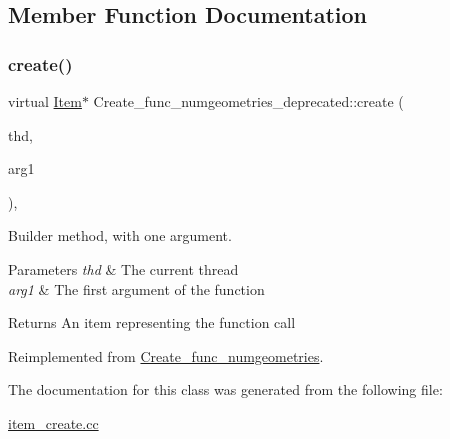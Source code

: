 \subsection{Member Function Documentation}
\mbox{\label{classCreate__func__numgeometries__deprecated_aeb6f235f1d620a8b4188aacfc513c860}} 
\subsubsection{\texorpdfstring{create()}{create()}}
{\footnotesize\ttfamily virtual \mbox{\hyperlink{classItem}{Item}}$\ast$ Create\+\_\+func\+\_\+numgeometries\+\_\+deprecated\+::create (\begin{DoxyParamCaption}\item[{T\+HD $\ast$}]{thd,  }\item[{\mbox{\hyperlink{classItem}{Item}} $\ast$}]{arg1 }\end{DoxyParamCaption})\hspace{0.3cm}{\ttfamily [inline]}, {\ttfamily [virtual]}}

Builder method, with one argument. 
\begin{DoxyParams}{Parameters}
{\em thd} & The current thread \\
\hline
{\em arg1} & The first argument of the function \\
\hline
\end{DoxyParams}
\begin{DoxyReturn}{Returns}
An item representing the function call 
\end{DoxyReturn}


Reimplemented from \mbox{\hyperlink{classCreate__func__numgeometries_a7271abfd27ec21a68910e66b908d3412}{Create\+\_\+func\+\_\+numgeometries}}.



The documentation for this class was generated from the following file\+:\begin{DoxyCompactItemize}
\item 
\mbox{\hyperlink{item__create_8cc}{item\+\_\+create.\+cc}}\end{DoxyCompactItemize}
